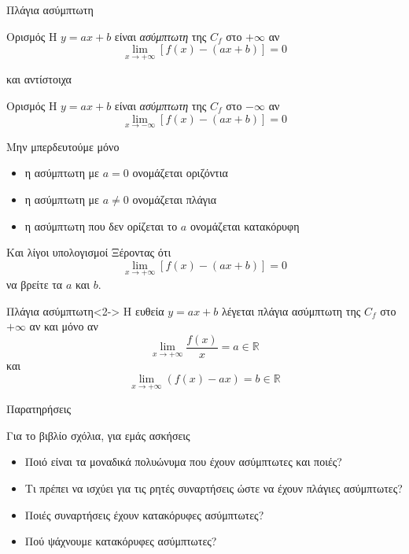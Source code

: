 \documentclass{presentation}
\begin{document}
\begin{frame}{Πλάγια ασύμπτωτη}
    \begin{block}{Ορισμός}
        Η $y=ax+b$ είναι \emph{ασύμπτωτη} της $C_f$ στο $+\infty$ αν $$\lim\limits_{x \to +\infty}{ [f(x)-(ax+b)] }=0$$
    \end{block}
    και αντίστοιχα
    \begin{block}{Ορισμός}
        Η $y=ax+b$ είναι \emph{ασύμπτωτη} της $C_f$ στο $-\infty$ αν $$\lim\limits_{x \to -\infty}{ [f(x)-(ax+b)] }=0$$
    \end{block}
\end{frame}

\begin{frame}{Μην μπερδευτούμε μόνο}
    \begin{itemize}
        \item<1-> η ασύμπτωτη με $a=0$ ονομάζεται οριζόντια
        \item<2-> η ασύμπτωτη με $a\ne 0$ ονομάζεται πλάγια
        \item<3-> η ασύμπτωτη που δεν ορίζεται το $a$ ονομάζεται κατακόρυφη
    \end{itemize}
\end{frame}

\begin{frame}{Και λίγοι υπολογισμοί}
    Ξέροντας ότι
    $$\lim\limits_{x \to +\infty}{ [f(x)-(ax+b)] }=0$$
    να βρείτε τα $a$ και $b$.
    \begin{block}{Πλάγια ασύμπτωτη}<2->
        Η ευθεία $y=ax+b$ λέγεται πλάγια ασύμπτωτη της $C_f$ στο $+\infty$ αν και μόνο αν
        $$\lim\limits_{x \to +\infty}{ \dfrac{f(x)}{x} }=a\in\mathbb{R}$$
        και
        $$\lim\limits_{x \to +\infty}{ (f(x)-ax) }=b\in\mathbb{R}$$
    \end{block}
\end{frame}

\begin{frame}{Παρατηρήσεις}

    Για το βιβλίο σχόλια, για εμάς ασκήσεις

    \begin{itemize}
        \item<1-> Ποιό είναι τα μοναδικά πολυώνυμα που έχουν ασύμπτωτες και ποιές?
        \item<2-> Τι πρέπει να ισχύει για τις ρητές συναρτήσεις ώστε να έχουν πλάγιες ασύμπτωτες?
        \item<3-> Ποιές συναρτήσεις έχουν κατακόρυφες ασύμπτωτες?
        \item<4-> Πού ψάχνουμε κατακόρυφες ασύμπτωτες?
    \end{itemize}

\end{frame}
\end{document}
